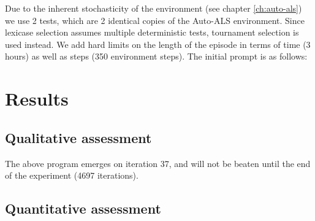 Due to the inherent stochasticity of the environment (see chapter \ref{ch:auto-als}) we use 2 tests, which are 2 identical copies of the Auto-ALS environment.
Since lexicase selection assumes multiple deterministic tests, tournament selection is used instead.
We add hard limits on the length of the episode in terms of time (3 hours) as well as steps (350 environment steps).
The initial prompt is as follows:



\newpage
\section{Results}

\subsection{Qualitative assessment}



The above program emerges on iteration 37, and will not be beaten until the end of the experiment (4697 iterations).

\newpage
\subsection{Quantitative assessment}

